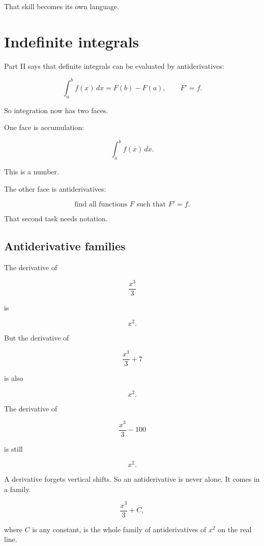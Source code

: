 That skill becomes its own language.

\section{Indefinite integrals}
\label{sec:indefinite-integrals}

Part II says that definite integrals can be evaluated by antiderivatives:

\[
\int_a^b f(x)\,dx=F(b)-F(a),
\qquad F'=f.
\]

So integration now has two faces.

One face is accumulation:

\[
\int_a^b f(x)\,dx.
\]

This is a number.

The other face is antiderivatives:

\[
\text{find all functions }F\text{ such that }F'=f.
\]

That second task needs notation.

\subsection{Antiderivative families}
\label{subsec:antiderivative-families}

The derivative of

\[
\frac{x^3}{3}
\]

is

\[
x^2.
\]

But the derivative of

\[
\frac{x^3}{3}+7
\]

is also

\[
x^2.
\]

The derivative of

\[
\frac{x^3}{3}-100
\]

is still

\[
x^2.
\]

A derivative forgets vertical shifts.  So an antiderivative is never alone.  It comes in a
family.

\[
\frac{x^3}{3}+C,
\]

where \(C\) is any constant, is the whole family of antiderivatives of \(x^2\) on the real
line.

